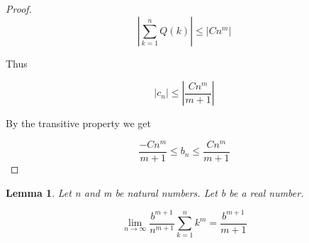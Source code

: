 \documentclass{article}
\newtheorem{lemma}{Lemma}
\begin{document}
\begin{proof}
\begin{equation*}
\left| \sum_{k=1}^{n} Q(k) \right| \le \left| Cn^{m} \right|
\end{equation*}

Thus

\begin{equation*}
|c_{n}| \le \left| \frac{Cn^{m}}{m+1} \right|
\end{equation*}

By the transitive property we get

\begin{equation*}
\frac{-Cn^{m}}{m+1} \le b_{n} \le \frac{Cn^{m}}{m+1} 
\end{equation*}

\end{proof}

\begin{lemma}
Let n and m be natural numbers. Let b be a real number.

\begin{equation*}
\lim_{n \to \infty} \frac{b^{m+1}}{n^{m+1}} \sum_{k=1}^{n} k^{m} = \displaystyle \frac{b^{m+1}}{m+1}
\end{equation*}
\end{lemma}
\end{document}
